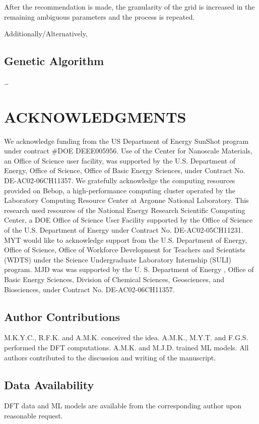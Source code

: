\documentclass[11pt]{article}
\begin{document}
After the recommendation is made, the granularity of the grid is
increased in the remaining ambiguous parameters and the process is
repeated.

Additionally/Alternatively,

\subsection{Genetic Algorithm}
\label{sec:org77f6fec}
\ldots{}\\

\section{ACKNOWLEDGMENTS}
\label{sec:org0f55089}
We acknowledge funding from the US Department of Energy SunShot program
under contract \#DOE DEEE005956. Use of the Center for Nanoscale
Materials, an Office of Science user facility, was supported by the U.S.
Department of Energy, Office of Science, Office of Basic Energy
Sciences, under Contract No. DE-AC02-06CH11357. We gratefully
acknowledge the computing resources provided on Bebop, a
high-performance computing cluster operated by the Laboratory Computing
Resource Center at Argonne National Laboratory. This research used
resources of the National Energy Research Scientific Computing Center, a
DOE Office of Science User Facility supported by the Office of Science
of the U.S. Department of Energy under Contract No. DE-AC02-05CH11231.
MYT would like to acknowledge support from the U.S. Department of
Energy, Office of Science, Office of Workforce Development for Teachers
and Scientists (WDTS) under the Science Undergraduate Laboratory
Internship (SULI) program. MJD was was supported by the U. S. Department
of Energy , Office of Basic Energy Sciences, Division of Chemical
Sciences, Geosciences, and Biosciences, under Contract No.
DE-AC02-06CH11357.

\subsection{Author Contributions}
\label{sec:orgade9ce1}
M.K.Y.C., R.F.K. and A.M.K. conceived the idea. A.M.K., M.Y.T. and
F.G.S. performed the DFT computations. A.M.K. and M.J.D. trained ML
models. All authors contributed to the discussion and writing of the
manuscript.

\subsection{Data Availability}
\label{sec:org8d52e0c}
DFT data and ML models are available from the corresponding author upon
reasonable request.
\end{document}
